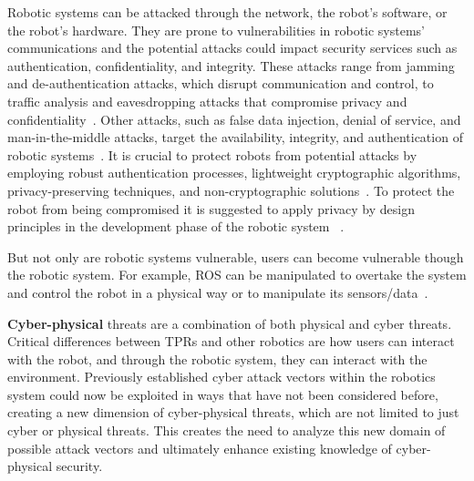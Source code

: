 Robotic systems can be attacked through the network, the robot's software, or the robot's hardware. They are prone to vulnerabilities in
robotic
systems'
communications and the potential attacks could impact security services such as authentication, confidentiality, and
integrity. These attacks range from jamming and de-authentication attacks, which disrupt communication and control, to traffic analysis
and eavesdropping attacks that compromise privacy and confidentiality~\cite[122]{robotics_cyber_security_2022}. Other attacks, such as false data injection, denial of service,
and man-in-the-middle attacks, target the availability, integrity, and authentication of robotic systems~\cite[126-128]{
  robotics_cyber_security_2022}. It is crucial to protect robots from potential attacks by employing robust authentication processes,
lightweight cryptographic algorithms, privacy-preserving techniques, and non-cryptographic solutions~\cite[147-149]{
  robotics_cyber_security_2022}. To protect the robot from being compromised it is suggested to apply privacy by design principles in the
development phase of the robotic system ~\cite[]{smart_design_engineering_2020,role_of_security_in_human_robot_2017, robotics_cyber_security_2022}.

But not only are robotic systems vulnerable, users can become vulnerable though the robotic system. For example, \ac{ROS} can be manipulated to overtake the system and control the robot in a physical way or to manipulate its sensors/data~\cite[]{role_of_security_in_human_robot_2017}.


\textbf{Cyber-physical} threats are a combination of both physical and cyber threats.
Critical differences between TPRs and other robotics are how users can interact with the robot, and through the robotic system,
they can interact with the environment. Previously established cyber attack
vectors within the robotics system could now be exploited in ways that have not been considered before, creating a new dimension of
cyber-physical threats, which are not limited to just cyber or physical threats. This creates the need to analyze this new domain of
possible attack vectors and ultimately enhance existing knowledge of cyber-physical security.

